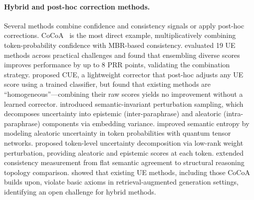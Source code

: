 \paragraph{Hybrid and post-hoc correction methods.}
Several methods combine confidence and consistency signals or apply post-hoc corrections.
CoCoA~\citep{cocoa2024} is the most direct example, multiplicatively combining token-probability confidence with MBR-based consistency.
\citet{bakman2025wild} evaluated 19 UE methods across practical challenges and found that ensembling diverse scores improves performance by up to 8 PRR points, validating the combination strategy.
\citet{li2025cue} proposed CUE, a lightweight corrector that post-hoc adjusts any UE score using a trained classifier, but found that existing methods are ``homogeneous''---combining their raw scores yields no improvement without a learned corrector.
\citet{cox2025mapping} introduced semantic-invariant perturbation sampling, which decomposes uncertainty into epistemic (inter-paraphrase) and aleatoric (intra-paraphrase) components via embedding variance.
\citet{vipulanandan2026qtn} improved semantic entropy by modeling aleatoric uncertainty in token probabilities with quantum tensor networks.
\citet{zhang2026tokur} proposed token-level uncertainty decomposition via low-rank weight perturbation, providing aleatoric and epistemic scores at each token.
\citet{da2025topouq} extended consistency measurement from flat semantic agreement to structural reasoning topology comparison.
\citet{soudani2025rag} showed that existing UE methods, including those CoCoA builds upon, violate basic axioms in retrieval-augmented generation settings, identifying an open challenge for hybrid methods.
